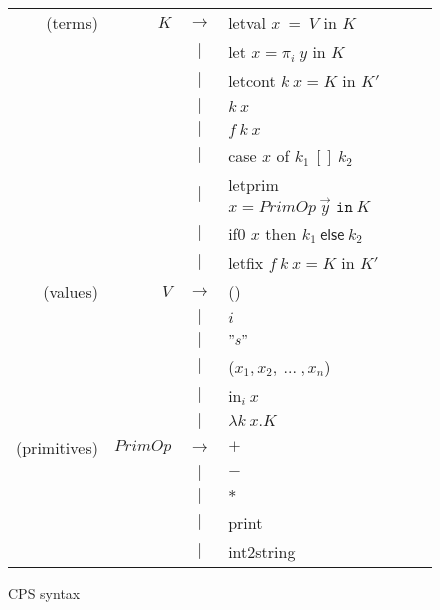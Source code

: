 \documentclass{article}
\theoremstyle{definition}
\theoremstyle{remark}
\numberwithin{equation}{section}
\begin{document}
\begin{figure}[!ht]
  \centering
\begin{tabular}{rrcl}
(terms) & $K$ & $\to$ & \textsf{letval }$x\ =\ V$ \textsf{ in } $K$ \\
        &     & $|$ & \textsf{let }$x = \pi _i\ y$\textsf{ in }$K$\\
        &     & $|$ & \textsf{letcont }$k\ x = K$\textsf{ in }$K'$\\
        &     & $|$ &  $k\ x$ \\
        &     & $|$ & $f\ k\ x$ \\
        &     & $|$ & \textsf{case} $x$ \textsf{of} $k_1\ [\!]\ k_2$\\
        &     & $|$ & \textsf{letprim} $x=PrimOp\ \vec{y}
         \texttt{ in}\ K$\\
        &     & $|$ &\textsf{if0} $x$ \textsf{then} $k_1\ \textsf{else}\ k_2$\\
        &     & $|$ &\textsf{letfix }$f\ k\ x=K$\textsf{ in }$K'$\\

(values) & $V$ & $\to$ & () \\
        &     & $|$ & $i$\\
        &     & $|$ & $"s"$\\
        &     & $|$ & ($x_1,x_2,\ ...\ , x_n$)\\
        &     & $|$ & \textsf{in}$_i\ x$\\
        &     & $|$ &  $\lambda k\ x.K$ \\

(primitives) & $PrimOp$ & $\to$ & $+$ \\
        &     & $|$ & $-$\\
        &     & $|$ & $*$\\
        &     & $|$ & \textsf{print}\\
        &     & $|$ & \textsf{int2string}\\
\end{tabular}
  \caption{CPS syntax}
  \label{fig-sub}
\end{figure}
\end{document}
